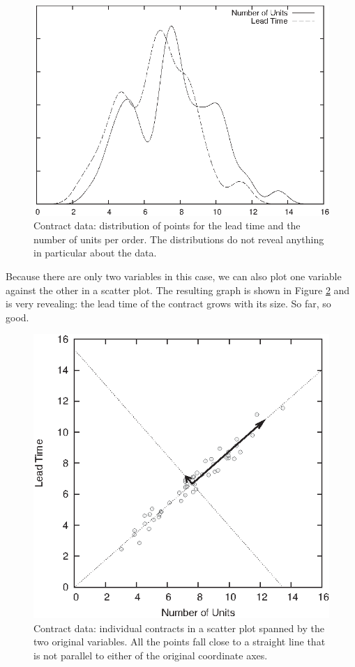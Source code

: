 \begin{figure}
  \centerline{\includegraphics{img/pca1}}
  \caption{Contract data: distribution of points for the lead time and
    the number of units per order. The distributions do not reveal 
    anything in particular about the data.}
  \label{fig:pca1}
\end{figure}

Because there are only two variables in this case, we can also plot
one variable against the other in a scatter plot. The resulting graph
is shown in Figure \ref{fig:pca2} and is very revealing: the lead time
of the contract grows with its size. So far, so good.

\begin{figure}
  \centerline{\includegraphics{img/pca2}}
  \caption{Contract data: individual contracts in a scatter plot
    spanned by the two original variables. All the points fall close
    to a straight line that is not parallel to either of the original
    coordinate axes.}
  \label{fig:pca2}
\end{figure}

